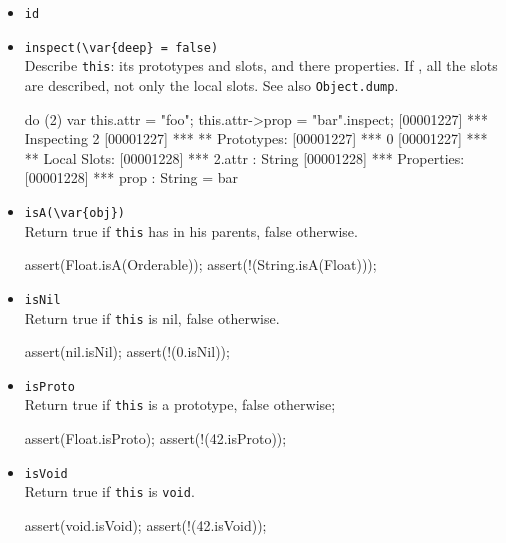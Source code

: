 \begin{itemize}
\item \lstinline|id|\\

\item \lstinline|inspect(\var{deep} = false)|\\
  Describe \lstinline|this|: its prototypes and slots, and there
  properties.  If , all the slots are described, not only
  the local slots. See also \lstinline|Object.dump|.
\begin{urbiscript}[firstnumber=last]
do (2) { var this.attr = "foo"; this.attr->prop = "bar"}.inspect;
[00001227] *** Inspecting 2
[00001227] *** ** Prototypes:
[00001227] ***   0
[00001227] *** ** Local Slots:
[00001228] ***   2.attr : String
[00001228] ***     Properties:
[00001228] ***      prop : String = bar
\end{urbiscript}

\item \lstinline|isA(\var{obj})|\\
  Return true if \lstinline|this| has  in his parents, false
  otherwise.

\begin{urbiscript}[firstnumber=last]
assert(Float.isA(Orderable));
assert(!(String.isA(Float)));
\end{urbiscript}

\item \lstinline|isNil|\\
  Return true if \lstinline|this| is nil, false otherwise.

\begin{urbiscript}[firstnumber=last]
assert(nil.isNil);
assert(!(0.isNil));
\end{urbiscript}

\item \lstinline|isProto|\\
  Return true if \lstinline|this| is a prototype, false otherwise;

\begin{urbiscript}[firstnumber=last]
assert(Float.isProto);
assert(!(42.isProto));
\end{urbiscript}

\item \lstinline|isVoid|\\
  Return true if \lstinline|this| is \lstinline|void|.

\begin{urbiscript}[firstnumber=last]
assert(void.isVoid);
assert(!(42.isVoid));
\end{urbiscript}


\end{itemize}
